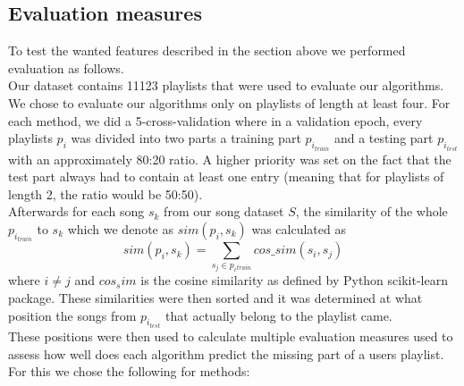 \subsection{Evaluation measures}
To test the wanted features described in the section above we performed evaluation as follows. \\
Our dataset contains 11123 playlists that were used to evaluate our algorithms. We chose to evaluate our algorithms only on playlists of length at least four. For each method, we did a 5-cross-validation where in a validation epoch, every playlists $p_i$ was divided into two parts a training part $p_{i_{train}}$ and a testing part $p_{i_{test}}$ with an approximately 80:20 ratio. A higher priority was set on the fact that the test part always had to contain at least one entry (meaning that for playlists of length 2, the ratio would be 50:50). \\
Afterwards for each song $ s_k $ from our song dataset $S$, the similarity of the whole $p_{i_{train}}$ to $s_k$ which we denote as $ sim(p_i, s_k) $ was calculated as $$ sim(p_i, s_k) =\sum_{s_j\in{p_i{_{train}}}} cos\_sim(s_i, s_j) $$ where $ i \neq j$ and $cos_sim$ is the cosine similarity as defined by Python scikit-learn package. These similarities were then sorted and it was determined at what position the songs from $p_{i_{test}} $ that actually belong to the playlist came. \\
These positions were then used to calculate multiple evaluation measures used to assess how well does each algorithm predict the missing part of a users playlist. For this we chose the following for methods:
